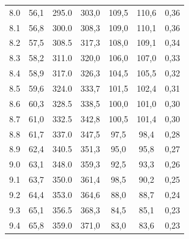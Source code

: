 \documentclass[titlepage = firstcover]{scrartcl}
\begin{document}
\begin{table}[h]
\begin{tabular}{c c c c c c c}
            8.0	                &  56,1              &  295.0          &    303,0       &    109,5        &    110,6       &  0,36 \\
            8.1	                &  56,8              &  300.0          &    308,3       &    109,0        &    110,1       &  0,36 \\
            8.2	                &  57,5              &  308.5          &    317,3       &    108,0        &    109,1       &  0,34 \\
            8.3	                &  58,2              &  311.0          &    320,0       &    106,0        &    107,0       &  0,33 \\
            8.4	                &  58,9              &  317.0          &    326,3       &    104,5        &    105,5       &  0,32 \\
            8.5	                &  59,6              &  324.0          &    333,7       &    101,5        &    102,4       &  0,31 \\
            8.6	                &  60,3              &  328.5          &    338,5       &    100,0        &    101,0       &  0,30 \\
            8.7	                &  61,0              &  332.5          &    342,8       &    100,5        &    101,4       &  0,30 \\
            8.8	                &  61,7              &  337.0          &    347,5       &    97,5         &    98,4        &  0,28 \\
            8.9	                &  62,4              &  340.5          &    351,3       &    95,0         &    95,8        &  0,27 \\
            9.0	                &  63,1              &  348.0          &    359,3       &    92,5         &    93,3        &  0,26 \\
            9.1	                &  63,7              &  350.0          &    361,4       &    98,5         &    90,2        &  0,25 \\
            9.2	                &  64,4              &  353.0          &    364,6       &    88,0         &    88,7        &  0,24 \\
            9.3	                &  65,1              &  356.5          &    368,3       &    84,5         &    85,1        &  0,23 \\
            9.4	                &  65,8              &  359.0          &    371,0       &    83,0         &    83,6        &  0,23 \\

\end{tabular}
\end{table}
\end{document}
